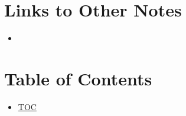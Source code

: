 \section*{Links to Other Notes}
\begin{itemize}
  \item \href{}{}
\end{itemize}

\section*{Table of Contents}
\begin{itemize}
  \item \hyperref[toc]{TOC}
\end{itemize}

